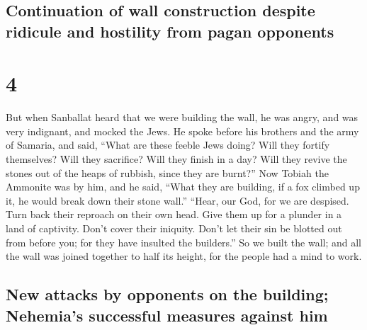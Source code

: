 \hypertarget{continuation-of-wall-construction-despite-ridicule-and-hostility-from-pagan-opponents}{%
\subsection{Continuation of wall construction despite ridicule and
hostility from pagan
opponents}\label{continuation-of-wall-construction-despite-ridicule-and-hostility-from-pagan-opponents}}

\hypertarget{section-3}{%
\section{4}\label{section-3}}

 But when Sanballat heard that we were building the wall,
he was angry, and was very indignant, and mocked the Jews.
 He spoke before his brothers and the army of Samaria, and
said, ``What are these feeble Jews doing? Will they fortify themselves?
Will they sacrifice? Will they finish in a day? Will they revive the
stones out of the heaps of rubbish, since they are burnt?''
 Now Tobiah the Ammonite was by him, and he said, ``What
they are building, if a fox climbed up it, he would break down their
stone wall.''  ``Hear, our God, for we are despised. Turn
back their reproach on their own head. Give them up for a plunder in a
land of captivity.  Don't cover their iniquity. Don't let
their sin be blotted out from before you; for they have insulted the
builders.''  So we built the wall; and all the wall was
joined together to half its height, for the people had a mind to work.

\hypertarget{new-attacks-by-opponents-on-the-building-nehemias-successful-measures-against-him}{%
\subsection{New attacks by opponents on the building; Nehemia's
successful measures against
him}\label{new-attacks-by-opponents-on-the-building-nehemias-successful-measures-against-him}}

